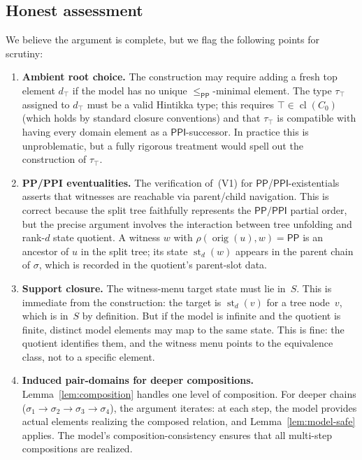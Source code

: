 \documentclass[11pt]{article}
\theoremstyle{definition}
\theoremstyle{remark}
\newcommand{\PP}{\mathsf{PP}}
\newcommand{\PPI}{\mathsf{PPI}}
\newcommand{\cl}{\operatorname{cl}}
\newcommand{\st}{\operatorname{st}}
\newcommand{\orig}{\operatorname{orig}}
\begin{document}
\subsection{Honest assessment}

We believe the argument is complete, but we flag the following
points for scrutiny:

\begin{enumerate}
\item \textbf{Ambient root choice.}\; The construction may require
  adding a fresh top element $d_\top$ if the model has no unique
  $\le_{\PP}$-minimal element.  The type $\tau_\top$ assigned to
  $d_\top$ must be a valid Hintikka type; this requires $\top\in\cl(C_0)$
  (which holds by standard closure conventions) and that $\tau_\top$
  is compatible with having every domain element as a $\PPI$-successor.
  In practice this is unproblematic, but a fully rigorous treatment
  would spell out the construction of $\tau_\top$.

\item \textbf{PP/PPI eventualities.}\; The verification of~(V1) for
  $\PP$/$\PPI$-existentials asserts that witnesses are reachable via
  parent/child navigation.  This is correct because the split tree
  faithfully represents the $\PP/\PPI$ partial order, but the
  precise argument involves the interaction between tree unfolding
  and rank-$d$ state quotient.  A witness $w$ with
  $\rho(\orig(u),w)=\PP$ is an ancestor of $u$ in the split tree;
  its state $\st_d(w)$ appears in the parent chain of $\sigma$, which
  is recorded in the quotient's parent-slot data.

\item \textbf{Support closure.}\; The witness-menu target state must
  lie in~$S$.  This is immediate from the construction: the target is
  $\st_d(v)$ for a tree node~$v$, which is in~$S$ by definition.
  But if the model is infinite and the quotient is finite, distinct
  model elements may map to the same state.  This is fine: the
  quotient identifies them, and the witness menu points to the
  equivalence class, not to a specific element.

\item \textbf{Induced pair-domains for deeper compositions.}\;
  Lemma~\ref{lem:composition} handles one level of composition.
  For deeper chains ($\sigma_1 \to \sigma_2 \to \sigma_3 \to \sigma_4$),
  the argument iterates: at each step, the model provides actual
  elements realizing the composed relation, and
  Lemma~\ref{lem:model-safe} applies.  The model's
  composition-consistency ensures that all multi-step compositions
  are realized.
\end{enumerate}
\end{document}
